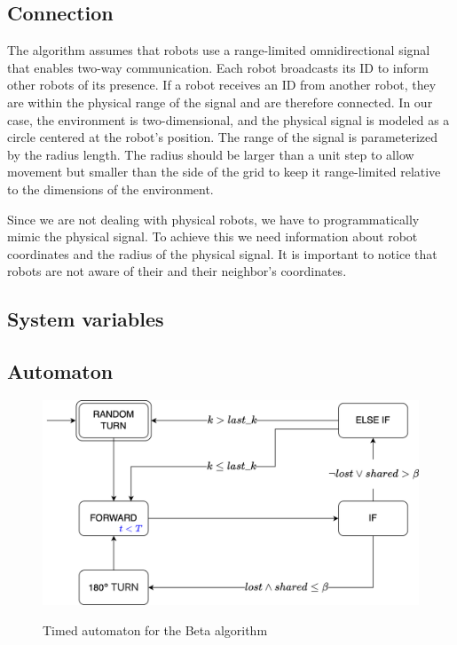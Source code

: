 \subsection{Connection}
 The algorithm assumes that robots use a range-limited omnidirectional signal that enables two-way communication. Each robot broadcasts its ID to inform other robots of its presence. If a robot receives an ID from another robot, they are within the physical range of the signal and are therefore connected. In our case, the environment is two-dimensional, and the physical signal is modeled as a circle centered at the robot's position. The range of the signal is parameterized by the radius length. The radius should be larger than a unit step to allow movement but smaller than the side of the grid to keep it range-limited relative to the dimensions of the environment.

Since we are not dealing with physical robots, we have to programmatically mimic the physical signal. To achieve this we need information about robot coordinates and the radius of the physical signal. It is important to notice that robots are not aware of their and their neighbor's coordinates. 


\subsection{System variables}



\subsection{Automaton}

\begin{figure}[H]
\caption{Timed automaton for the Beta algorithm}
\includegraphics[width=\textwidth]{images/beta.png}
\label{fig:automaton}
\end{figure}
